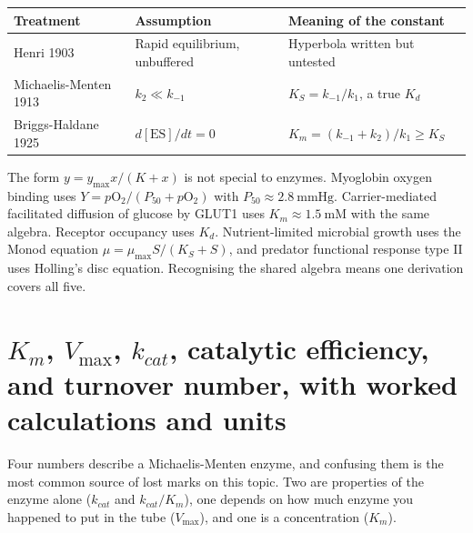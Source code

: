 \begin{tabular}{@{}lp{3.0cm}p{4.2cm}@{}}
\toprule
\textbf{Treatment} & \textbf{Assumption} & \textbf{Meaning of the constant}\\
\midrule
Henri 1903 & Rapid equilibrium, unbuffered & Hyperbola written but untested\\
Michaelis-Menten 1913 & $k_2\ll k_{-1}$ & $K_S=k_{-1}/k_1$, a true $K_d$\\
Briggs-Haldane 1925 & $d[\mathrm{ES}]/dt=0$ & $K_m=(k_{-1}+k_2)/k_1\geq K_S$\\
\bottomrule
\end{tabular}

\begin{obsbox}[title={WORTH NOTICING: the same hyperbola appears in four other places}]
The form $y=y_{\max}x/(K+x)$ is not special to enzymes. Myoglobin oxygen binding uses
$Y=p\mathrm{O_2}/(P_{50}+p\mathrm{O_2})$ with $P_{50}\approx 2.8\ \mathrm{mmHg}$.
Carrier-mediated facilitated diffusion of glucose by GLUT1 uses
$K_m\approx 1.5\ \mathrm{mM}$ with the same algebra. Receptor occupancy uses $K_d$.
Nutrient-limited microbial growth uses the Monod equation
$\mu=\mu_{\max}S/(K_S+S)$, and predator functional response type II uses Holling's
disc equation. Recognising the shared algebra means one derivation covers all five.
\end{obsbox}

\section{$K_m$, $V_{\max}$, $k_{cat}$, catalytic efficiency, and turnover number, with worked calculations and units}

Four numbers describe a Michaelis-Menten enzyme, and confusing them is the most common
source of lost marks on this topic. Two are properties of the enzyme alone
($k_{cat}$ and $k_{cat}/K_m$), one depends on how much enzyme you happened to put in
the tube ($V_{\max}$), and one is a concentration ($K_m$).

